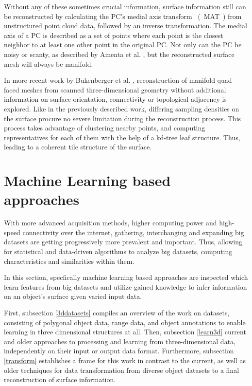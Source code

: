   
  Without any of these sometimes crucial information, surface information still can be reconstructed by
  calculating the PC's medial axis transform ~(~MAT~) from unstructured point cloud
  data, followed by an inverse transformation.  The medial axis of a PC
  is described as a set of points where each point is the closest neighbor 
  to at least one other point in the original PC. Not only can the PC be noisy 
  or scanty, as described by Amenta et al. \cite{Amenta:2001:PC:376957.376986}, but the reconstructed
  surface mesh will always be manifold.

  In more recent work by Bukenberger et al. \cite{bukenberger2018hierarchical},
  reconstruction of manifold quad faced meshes from 
  scanned three-dimensional geometry without additional
  information on surface orientation, connectivity or topological
  adjacency is explored. Like in the previously described work,
  differing sampling densities on the surface procure no severe 
  limitation during the reconstruction process. This process takes
  advantage of clustering nearby points, and computing 
  representatives for each of them with the help of a kd-tree 
  leaf structure. Thus, leading to a coherent tile structure 
  of the surface. 



\section{Machine Learning based approaches}
\label{ml_approaches}
With more advanced acquisition methods, higher computing power 
and high-speed connectivity over the internet, gathering, interchanging
 and expanding big datasets are getting progressively more prevalent
  and important. 
  Thus, allowing for statistical and data-driven algorithms to 
  analyze big datasets, computing characteristics and similarities
   within them. 
   
  In this section, specfically machine learning based approaches are inspected which learn features from big
  datasets and utilize gained knowledge to infer information on an object's surface given varied input data.

  First, subsection \ref{3ddatasets} compiles an overview of the work on datasets, consisting of polygonal object data, range data, and object annotations
  to enable learning in three dimensional structures at all.
  Then, subsection \ref{learn3d}  current and older approaches to processing 
  and learning from three-dimensional data, independently on their input or output data
  format. 
  Furthermore, subsection \ref{transform} establishes a frame for this work in 
  contrast to the current, as well as older techniques for data 
  transformation from diverse object datasets to a final reconstruction
  of surface information.

